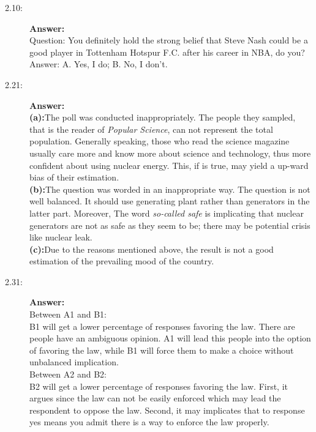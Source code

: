 \documentclass{article}
\begin{document}
\begin{description}
    \item[2.10:]{\bf Answer:}\\
    Question: You definitely hold the strong belief that Steve Nash could be a good player in Tottenham Hotspur F.C. after his career in NBA, do you?\\
    Answer: A. Yes, I do; B. No, I don't.
    \item[2.21:]{\bf Answer:}\\
    {\bf (a):}The poll was conducted inappropriately. The people they sampled, that is the reader of {\it Popular Science}, can not represent the total population. Generally speaking, those who read the science magazine usually care more and know more about science and technology, thus more confident about using nuclear energy. This, if is true, may yield a up-ward bias of their estimation.\\
    {\bf (b):}The question was worded in an inappropriate way. The question is not well balanced. It should use generating plant rather than generators in the latter part. Moreover, The word {\it so-called safe} is implicating that nuclear generators are not as safe as they seem to be; there may be potential crisis like nuclear leak.\\
    {\bf (c):}Due to the reasons mentioned above, the result is not a good estimation of the prevailing mood of the country.
    \item[2.31:]{\bf Answer:}\\
    Between A1 and B1:\\
    B1 will get a lower percentage of responses favoring the law. There are people have an ambiguous opinion. A1 will lead this people into the option of favoring the law, while B1 will force them to make a choice without unbalanced implication.\\
    Between A2 and B2:\\
    B2 will get a lower percentage of responses favoring the law. First, it argues since the law can not be easily enforced which may lead the respondent to oppose the law. Second, it may implicates that to response yes means you admit there is a way to enforce the law properly.

\end{description}
\end{document}

